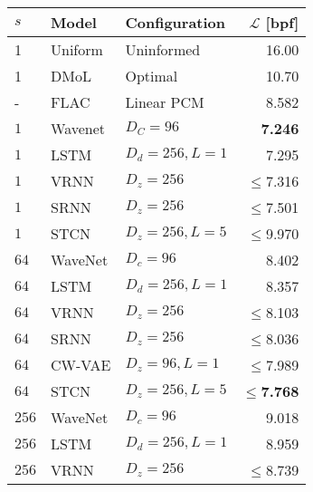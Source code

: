 {\begin{table}[t!]
    \centering
    \begin{tabular}{ll|lr}
        \toprule
        $s$    & \bfseries Model           & \bfseries Configuration           & \bfseries $\mathcal{L}$ [bpf] \\
        \midrule
        1         & Uniform             & Uninformed            & 16.00 \\
        1         & DMoL                & Optimal               & 10.70 \\   %
        -         & FLAC                & Linear PCM            & 8.582 \\
        \midrule
        $1$       & Wavenet             & $D_C=96$              & \textbf{7.246} \\
        $1$       & LSTM                & $D_d=256, L=1$        & 7.295 \\
        $1$       & VRNN                & $D_z=256$             & $\leq$7.316 \\
        $1$       & SRNN                & $D_z=256$             & $\leq$7.501 \\
        $1$       & STCN                & $D_z=256,L=5$         & $\leq$9.970 \\
        \midrule
        $64$      & WaveNet             & $D_c=96$              & 8.402 \\
        $64$      & LSTM                & $D_d=256, L=1$        & 8.357 \\
        $64$      & VRNN                & $D_z=256$             & $\leq$8.103 \\
        $64$      & SRNN                & $D_z=256$             & $\leq$8.036 \\
        $64$      & CW-VAE              & $D_z=96, L=1$         & $\leq$7.989 \\
        $64$      & STCN                & $D_z=256,L=5$  & $\leq$\textbf{7.768} \\
        \midrule
        $256$      & WaveNet             & $D_c=96$              & 9.018 \\
        $256$      & LSTM                & $D_d=256, L=1$        & 8.959 \\  %
        $256$      & VRNN                & $D_z=256$             & $\leq$8.739 \\

\end{tabular}
\end{table}}
